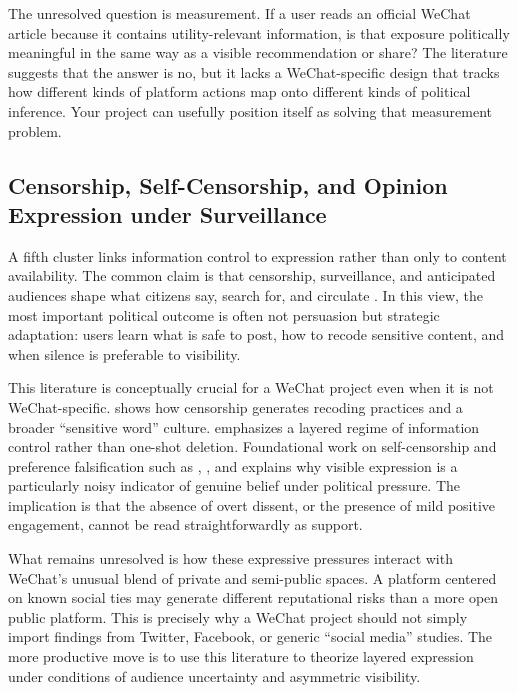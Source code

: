 \documentclass[12pt]{article}
\begin{document}
        The unresolved question is measurement. If a user reads an official WeChat article because it contains utility-relevant information, is that exposure politically meaningful in the same way as a visible recommendation or share? The literature suggests that the answer is no, but it lacks a WeChat-specific design that tracks how different kinds of platform actions map onto different kinds of political inference. Your project can usefully position itself as solving that measurement problem.

        \subsection{Censorship, Self-Censorship, and Opinion Expression under Surveillance}

        A fifth cluster links information control to expression rather than only to content availability. The common claim is that censorship, surveillance, and anticipated audiences shape what citizens say, search for, and circulate \citep{tai_2014_journal_of_east_asian_studies,sun_2022_politics_society,ye_2023_discourse_context_media,ShenTruex2020,Kuran1995,NoelleNeumann1993,xu_2022_jop}. In this view, the most important political outcome is often not persuasion but strategic adaptation: users learn what is safe to post, how to recode sensitive content, and when silence is preferable to visibility.

        This literature is conceptually crucial for a WeChat project even when it is not WeChat-specific. \citet{ye_2023_discourse_context_media} shows how censorship generates recoding practices and a broader ``sensitive word'' culture. \citet{sun_2022_politics_society} emphasizes a layered regime of information control rather than one-shot deletion. Foundational work on self-censorship and preference falsification such as \citet{ShenTruex2020}, \citet{Kuran1995}, and \citet{NoelleNeumann1993} explains why visible expression is a particularly noisy indicator of genuine belief under political pressure. The implication is that the absence of overt dissent, or the presence of mild positive engagement, cannot be read straightforwardly as support.

        What remains unresolved is how these expressive pressures interact with WeChat's unusual blend of private and semi-public spaces. A platform centered on known social ties may generate different reputational risks than a more open public platform. This is precisely why a WeChat project should not simply import findings from Twitter, Facebook, or generic ``social media'' studies. The more productive move is to use this literature to theorize layered expression under conditions of audience uncertainty and asymmetric visibility.
\end{document}
